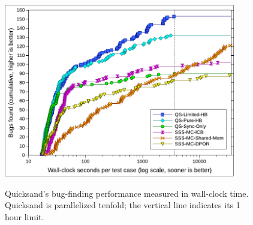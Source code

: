 \begin{figure}[h]
	\begin{center}
        \includegraphics[width=0.9\textwidth]{../proposal/dowefindbugsfaster-wallclock-v2.pdf} \\
	\end{center}
	\caption[Quicksand's bug-finding performance measured in wall-clock time.]
		{Quicksand's bug-finding performance measured in wall-clock time.
		Quicksand is parallelized tenfold; the vertical line indicates its 1 hour limit.}
        \label{fig:dowefindbugsfaster-wall}
\end{figure}


